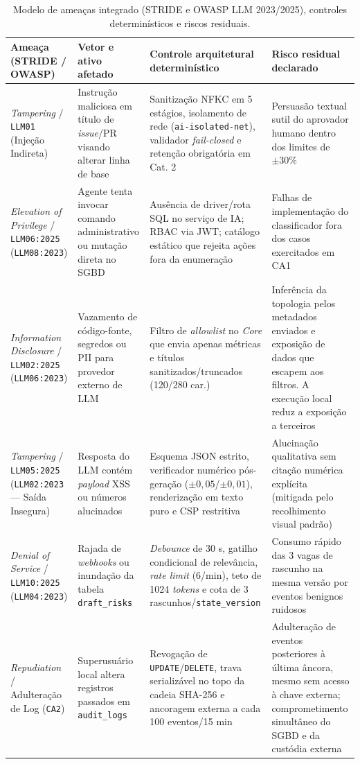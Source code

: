 \documentclass[12pt,openany,oneside,a4paper,english,brazilian,sumario=tradicional]{abntex2}
\newcommand{\fonteautores}{\par\vspace{1mm}{\small Fonte: Elaborado pelos autores (2026).}}
\begin{document}
\begin{table}[htbp]
\caption{Modelo de ameaças integrado (STRIDE e OWASP LLM 2023/2025), controles determinísticos e riscos residuais.}\label{tab:stride_owasp}
\scriptsize
\begin{tabularx}{\textwidth}{L{2.5cm} L{2.8cm} Y Y}
\toprule
\textbf{Ameaça (STRIDE / OWASP)} & \textbf{Vetor e ativo afetado} & \textbf{Controle arquitetural determinístico} & \textbf{Risco residual declarado}\\
\midrule
\textit{Tampering} / \texttt{LLM01} (Injeção Indireta) & Instrução maliciosa em título de \textit{issue}/PR visando alterar linha de base & Sanitização NFKC em 5 estágios, isolamento de rede (\texttt{ai-isolated-net}), validador \textit{fail-closed} e retenção obrigatória em Cat. 2 & Persuasão textual sutil do aprovador humano dentro dos limites de $\pm 30\%$\\
\textit{Elevation of Privilege} / \texttt{LLM06:2025} (\texttt{LLM08:2023}) & Agente tenta invocar comando administrativo ou mutação direta no SGBD & Ausência de driver/rota SQL no serviço de IA; RBAC via JWT; catálogo estático que rejeita ações fora da enumeração & Falhas de implementação do classificador fora dos casos exercitados em CA1\\
\textit{Information Disclosure} / \texttt{LLM02:2025} (\texttt{LLM06:2023}) & Vazamento de código-fonte, segredos ou PII para provedor externo de LLM & Filtro de \textit{allowlist} no \textit{Core} que envia apenas métricas e títulos sanitizados/truncados (120/280 car.) & Inferência da topologia pelos metadados enviados e exposição de dados que escapem aos filtros. A execução local reduz a exposição a terceiros\\
\textit{Tampering} / \texttt{LLM05:2025} (\texttt{LLM02:2023} --- Saída Insegura) & Resposta do LLM contém \textit{payload} XSS ou números alucinados & Esquema JSON estrito, verificador numérico pós-geração ($\pm 0{,}05$/$\pm 0{,}01$), renderização em texto puro e CSP restritiva & Alucinação qualitativa sem citação numérica explícita (mitigada pelo recolhimento visual padrão)\\
\textit{Denial of Service} / \texttt{LLM10:2025} (\texttt{LLM04:2023}) & Rajada de \textit{webhooks} ou inundação da tabela \texttt{draft\_\allowbreak risks} & \textit{Debounce} de 30 s, gatilho condicional de relevância, \textit{rate limit} (6/min), teto de 1024 \textit{tokens} e cota de 3 rascunhos/\texttt{state\_\allowbreak version} & Consumo rápido das 3 vagas de rascunho na mesma versão por eventos benignos ruidosos\\
\textit{Repudiation} / Adulteração de Log (\texttt{CA2}) & Superusuário local altera registros passados em \texttt{audit\_\allowbreak logs} & Revogação de \texttt{UPDATE}/\texttt{DELETE}, trava serializável no topo da cadeia SHA-256 e ancoragem externa a cada 100 eventos/15 min & Adulteração de eventos posteriores à última âncora, mesmo sem acesso à chave externa; comprometimento simultâneo do SGBD e da custódia externa\\
\bottomrule
\end{tabularx}
\fonteautores
\end{table}
\end{document}

